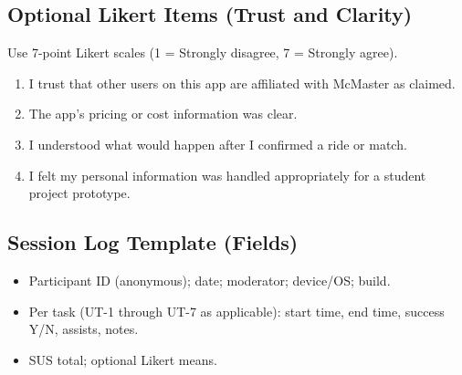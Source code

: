 \subsection*{Optional Likert Items (Trust and Clarity)}

Use 7-point Likert scales (1 = Strongly disagree, 7 = Strongly agree).

\begin{enumerate}
  \item I trust that other users on this app are affiliated with McMaster as claimed.
  \item The app's pricing or cost information was clear.
  \item I understood what would happen after I confirmed a ride or match.
  \item I felt my personal information was handled appropriately for a student project prototype.
\end{enumerate}

\subsection*{Session Log Template (Fields)}

\begin{itemize}
  \item Participant ID (anonymous); date; moderator; device/OS; build.
  \item Per task (UT-1 through UT-7 as applicable): start time, end time, success Y/N, assists, notes.
  \item SUS total; optional Likert means.
\end{itemize}
